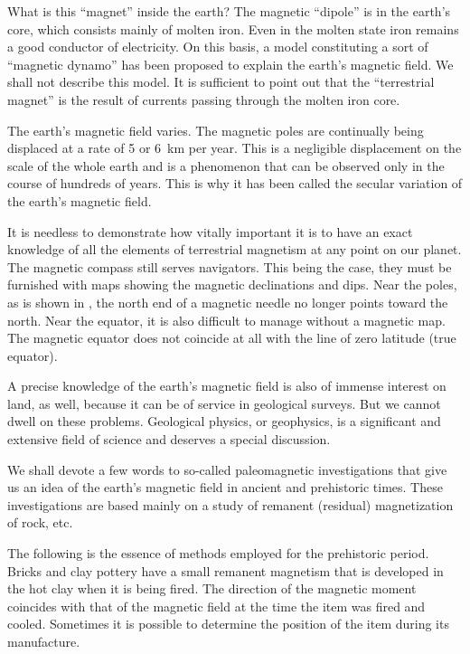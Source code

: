 What is this ``magnet'' inside the earth? The magnetic ``dipole'' is in the earth's core, which consists mainly of molten iron. Even in the molten state iron remains a good conductor of electricity. On this basis, a model constituting a sort of ``magnetic dynamo'' has been proposed to explain the earth's magnetic field. We shall not describe this model. It is sufficient to point out that the ``terrestrial magnet'' is the result of currents passing through the molten iron core.

The earth's magnetic field varies. The magnetic poles are continually being displaced at a rate of 5 or \SI{6}{\kilo\meter} per year. This is a negligible displacement on the scale of the whole earth and is a phenomenon that can be observed only in the course of hundreds of years. This is why it has been called the secular variation of the earth's magnetic field.

It is needless to demonstrate how vitally important it is to have an exact knowledge of all the elements of terrestrial magnetism at any point on our planet. The magnetic compass still serves navigators. This being the case, they must be furnished with maps showing the magnetic declinations and dips. Near the poles, as is shown in , the north end of a magnetic needle no longer points toward the north. Near the equator, it is also difficult to manage without a magnetic map. The magnetic equator does not coincide at all with the line of zero latitude (true equator).

A precise knowledge of the earth's magnetic field is also of immense interest on land, as well, because it can be of service in geological surveys. But we cannot dwell on these problems. Geological physics, or geophysics, is a significant and extensive field of science and deserves a special discussion.

We shall devote a few words to so-called paleomagnetic investigations that give us an idea of the earth's magnetic field in ancient and prehistoric times. These investigations are based mainly on a study of remanent (residual) magnetization of rock, etc.

The following is the essence of methods employed for the prehistoric period. Bricks and clay pottery have a small remanent magnetism that is developed in the hot clay when it is being fired. The direction of the magnetic moment coincides with that of the magnetic field at the time the item was fired and cooled. Sometimes it is possible to determine the position of the item during its manufacture.

